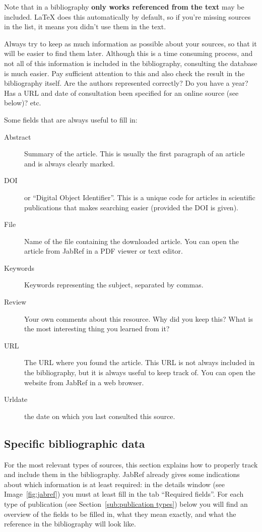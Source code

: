Note that in a bibliography \textbf{only works referenced from the text} may be included. {\LaTeX} does this automatically by default, so if you're missing sources in the list, it means you didn't use them in the text.

Always try to keep as much information as possible about your sources, so that it will be easier to find them later. Although this is a time consuming process, and not all of this information is included in the bibliography, consulting the database is much easier. Pay sufficient attention to this and also check the result in the bibliography itself. Are the authors represented correctly? Do you have a year? Has a URL and date of consultation been specified for an online source (see below)? etc.

Some fields that are always useful to fill in:

\begin{description}
   \item[Abstract] Summary of the article. This is usually the first paragraph of an article and is always clearly marked.
   \item[DOI] or ``Digital Object Identifier''. This is a unique code for articles in scientific publications that makes searching easier (provided the DOI is given).
   \item[File] Name of the file containing the downloaded article. You can open the article from JabRef in a PDF viewer or text editor.
   \item[Keywords] Keywords representing the subject, separated by commas.
   \item[Review] Your own comments about this resource. Why did you keep this? What is the most interesting thing you learned from it?
   \item[URL] The URL where you found the article. This URL is not always included in the bibliography, but it is always useful to keep track of. You can open the website from JabRef in a web browser.
   \item[Urldate] the date on which you last consulted this source.   
\end{description}

\subsection{Specific bibliographic data}
\label{sub:specific_bibliographic_data}

For the most relevant types of sources, this section explains how to properly track and include them in the bibliography. JabRef already gives some indications about which information is at least required: in the details window (see Image~\ref{fig:jabref}) you must at least fill in the tab ``Required fields''. For each type of publication (see Section~\ref{sub:publication types}) below you will find an overview of the fields to be filled in, what they mean exactly, and what the reference in the bibliography will look like.

